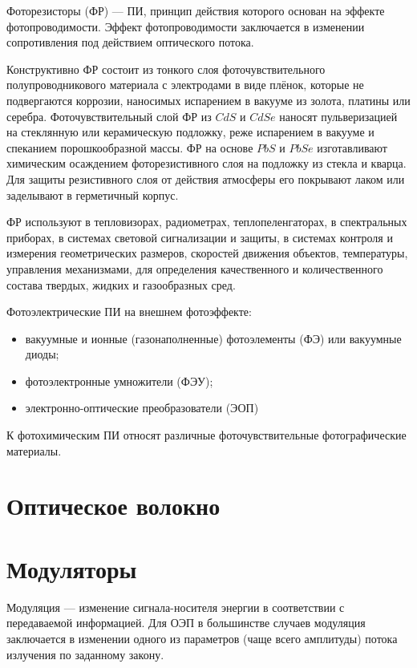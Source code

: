 Фоторезисторы (ФР) --- ПИ, принцип действия которого основан на эффекте фотопроводимости. 
Эффект фотопроводимости заключается в изменении сопротивления под действием оптического потока.

Конструктивно ФР состоит из тонкого слоя фоточувствительного полупроводникового материала с электродами в виде плёнок, которые не подвергаются коррозии, наносимых испарением в вакууме из золота, платины или серебра. 
Фоточувствительный слой ФР из $ CdS $ и $ CdSe $ наносят пульверизацией на стеклянную или керамическую подложку, реже испарением в вакууме и спеканием порошкообразной массы. ФР на основе $ PbS $ и $ PbSe $ изготавливают химическим осаждением фоторезистивного слоя на подложку из стекла и кварца.
Для защиты резистивного слоя от действия атмосферы его покрывают лаком или заделывают в герметичный корпус.

ФР используют в тепловизорах, радиометрах, теплопеленгаторах, в спектральных приборах, в системах световой сигнализации и защиты, в системах контроля и измерения геометрических размеров, скоростей движения объектов, температуры, управления механизмами, для определения качественного и количественного состава твердых, жидких и газообразных сред.

Фотоэлектрические ПИ на внешнем фотоэффекте:
\begin{itemize}
	\item вакуумные и ионные (газонаполненные) фотоэлементы (ФЭ) или вакуумные диоды;
	\item фотоэлектронные умножители (ФЭУ);
	\item электронно-оптические преобразователи (ЭОП)
\end{itemize}

К фотохимическим ПИ относят различные фоточувствительные фотографические материалы.

\section{Оптическое волокно}


\section{Модуляторы}

Модуляция --- изменение сигнала-носителя энергии в соответствии с передаваемой информацией.
Для ОЭП в большинстве случаев модуляция заключается в изменении одного из параметров (чаще всего амплитуды) потока излучения по заданному закону.
